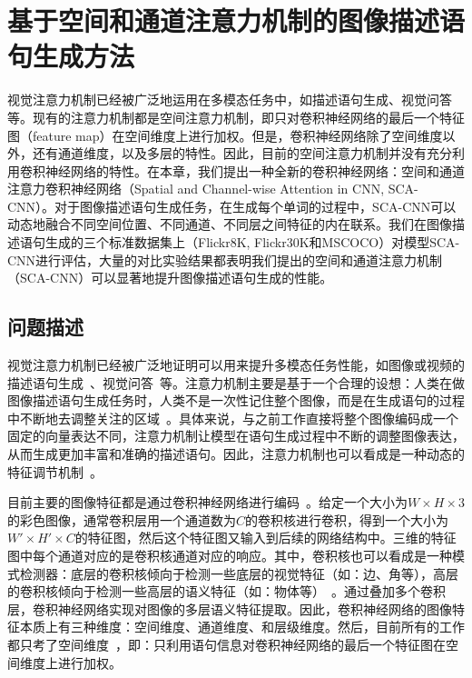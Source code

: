 \chapter{基于空间和通道注意力机制的图像描述语句生成方法}

视觉注意力机制已经被广泛地运用在多模态任务中，如描述语句生成、视觉问答等。现有的注意力机制都是空间注意力机制，即只对卷积神经网络的最后一个特征图（feature map）在空间维度上进行加权。但是，卷积神经网络除了空间维度以外，还有通道维度，以及多层的特性。因此，目前的空间注意力机制并没有充分利用卷积神经网络的特性。在本章，我们提出一种全新的卷积神经网络：空间和通道注意力卷积神经网络（Spatial and Channel-wise Attention in CNN, SCA-CNN）。对于图像描述语句生成任务，在生成每个单词的过程中，SCA-CNN可以动态地融合不同空间位置、不同通道、不同层之间特征的内在联系。我们在图像描述语句生成的三个标准数据集上（Flickr8K, Flickr30K和MSCOCO）对模型SCA-CNN进行评估，大量的对比实验结果都表明我们提出的空间和通道注意力机制（SCA-CNN）可以显著地提升图像描述语句生成的性能。


\section{问题描述}

视觉注意力机制已经被广泛地证明可以用来提升多模态任务性能，如图像或视频的描述语句生成~\cite{xu2015show,yao2015describing}、视觉问答~\cite{chen2016abc,yang2016stacked,xu2016ask}等。注意力机制主要是基于一个合理的设想：人类在做图像描述语句生成任务时，人类不是一次性记住整个图像，而是在生成语句的过程中不断地去调整关注的区域~\cite{corbetta2002control}。具体来说，与之前工作直接将整个图像编码成一个固定的向量表达不同，注意力机制让模型在语句生成过程中不断的调整图像表达，从而生成更加丰富和准确的描述语句。因此，注意力机制也可以看成是一种动态的特征调节机制~\cite{mnih2014recurrent,stollenga2014deep}。

目前主要的图像特征都是通过卷积神经网络进行编码~\cite{he2016deep,simonyan2015very}。给定一个大小为$W\times H\times 3$的彩色图像，通常卷积层用一个通道数为$C$的卷积核进行卷积，得到一个大小为$W'\times H'\times C$的特征图，然后这个特征图又输入到后续的网络结构中。三维的特征图中每个通道对应的是卷积核通道对应的响应。其中，卷积核也可以看成是一种模式检测器：底层的卷积核倾向于检测一些底层的视觉特征（如：边、角等），高层的卷积核倾向于检测一些高层的语义特征（如：物体等）~\cite{zeiler2014visualizing}。通过叠加多个卷积层，卷积神经网络实现对图像的多层语义特征提取。因此，卷积神经网络的图像特征本质上有三种维度：空间维度、通道维度、和层级维度。然后，目前所有的工作都只考了空间维度~\cite{xu2015show}，即：只利用语句信息对卷积神经网络的最后一个特征图在空间维度上进行加权。


